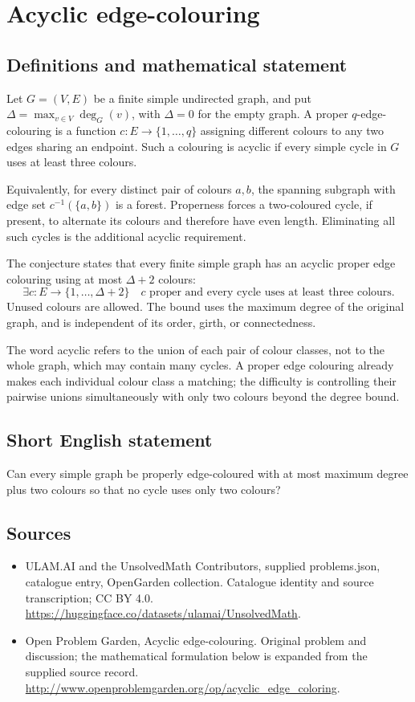 \documentclass[11pt,a4paper]{article}
\begin{document}
\section*{Acyclic edge-colouring}\label{statement}

\subsection{Definitions and mathematical statement}
Let $G=(V,E)$ be a finite simple undirected graph,
and put $\Delta=\max_{v\in V}\deg_G(v)$, with
$\Delta=0$ for the empty graph. A proper
$q$-edge-colouring is a function
$c:E\to\{1,\ldots,q\}$ assigning different
colours to any two edges sharing an endpoint.
Such a colouring is acyclic if every simple
cycle in $G$ uses at least three colours.

Equivalently, for every distinct pair of
colours $a,b$, the spanning subgraph with
edge set $c^{-1}(\{a,b\})$ is a forest.
Properness forces a two-coloured cycle,
if present, to alternate its colours and
therefore have even length. Eliminating
all such cycles is the additional acyclic
requirement.

The conjecture states that every finite
simple graph has an acyclic proper edge
colouring using at most $\Delta+2$ colours:
\[
 \exists c:E\to\{1,\ldots,\Delta+2\}
 \quad c\text{ proper and every cycle uses at least three colours}.
\]
Unused colours are allowed. The bound uses
the maximum degree of the original graph,
and is independent of its order, girth,
or connectedness.

The word acyclic refers to the union of
each pair of colour classes, not to the
whole graph, which may contain many cycles.
A proper edge colouring already makes
each individual colour class a matching;
the difficulty is controlling their pairwise
unions simultaneously with only two colours
beyond the degree bound.
\subsection{Short English statement}
Can every simple graph be properly edge-coloured with at most maximum degree plus two colours so that no cycle uses only two colours?
\subsection{Sources}
\begin{itemize}
\item[S1] ULAM.AI and the UnsolvedMath Contributors, supplied problems.json, catalogue entry, OpenGarden collection. Catalogue identity and source transcription; CC BY 4.0.
\url{https://huggingface.co/datasets/ulamai/UnsolvedMath}.
\item[S2] Open Problem Garden, Acyclic edge-colouring. Original problem and discussion; the mathematical formulation below is expanded from the supplied source record.
\url{http://www.openproblemgarden.org/op/acyclic_edge_coloring}.
\end{itemize}
\end{document}

